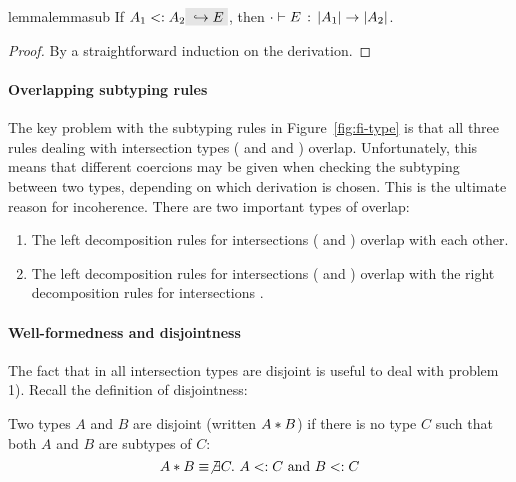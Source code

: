 \begin{restatable}{lemma}{lemmasub}
  \label{lemma:sub}
  If $ A_1 \subtype A_2 \yields E $, then $ \cdot \vdash E \ \!:\! \ \lvert A_1 \rvert \to \lvert A_2 \rvert $.
\end{restatable}

\begin{proof}
  By a straightforward induction on the derivation.
\end{proof}

\paragraph{Overlapping subtyping rules} The key problem with the
subtyping rules in Figure~\ref{fig:fi-type} is that all three rules dealing
with intersection types ( and
 and ) overlap.
Unfortunately, this means that different coercions may be given when checking
the subtyping between two types, depending on which derivation is chosen. This
is the ultimate reason for incoherence. There are two important types of
overlap:

\begin{enumerate}

\item The left decomposition rules for intersections (
and ) overlap with each other.

\item The left decomposition rules for intersections (
and ) overlap with the right decomposition rules for
intersections .

\end{enumerate}

\paragraph{Well-formedness and disjointness} 
The fact that in \name all intersection types are disjoint is useful to deal
with problem 1). Recall the definition of disjointness:

\begin{definition}\label{def:simple_dis}
  Two types $A$ and $B$ are disjoint
  (written $A * B$) if there is no type $C$ such that both $A$ and $B$ are
  subtypes of $C$:
  \[A * B \equiv \not\exists C.~A <: C~\text{and}~B <: C\]
\end{definition}

